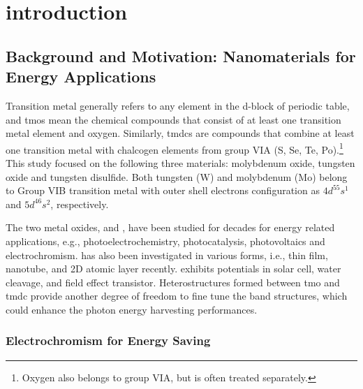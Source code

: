 
\chapter{introduction}

\section{Background and Motivation: Nanomaterials for Energy Applications}

Transition metal generally refers to any element in the d-block of periodic table, and \glspl{tmo} mean the chemical compounds that consist of at least one transition metal element and oxygen. Similarly, \glspl{tmdc} are compounds that combine at least one transition metal with chalcogen elements from group VIA (S, Se, Te, Po).\footnote{Oxygen also belongs to group VIA, but is often treated separately.} This study focused on the following three materials: molybdenum oxide, tungsten oxide and tungsten disulfide. Both tungsten (W) and molybdenum (Mo) belong to Group VIB transition metal with outer shell electrons configuration as $4d^55s^1$ and $5d^46s^2$, respectively. 
 
The two metal oxides,  and , have been studied for decades for energy related applications, e.g., photoelectrochemistry,\cite{Su2010} photocatalysis,\cite{Watcharenwong2008, Macphee2010} photovoltaics\cite{Coridan2013} and electrochromism.\cite{Yoshimura1985, Mortimer2011}  has also been investigated in various forms, i.e., thin film, nanotube, and 2D atomic layer recently.  exhibits potentials in solar cell,\cite{Britnell2013} water cleavage,\cite{Ballif1999} and field effect transistor.\cite{Perkins2013} Heterostructures formed between \gls{tmo} and \gls{tmdc} provide another degree of freedom to fine tune the band structures, which could enhance the photon energy harvesting performances. 

\subsection{Electrochromism for Energy Saving}


